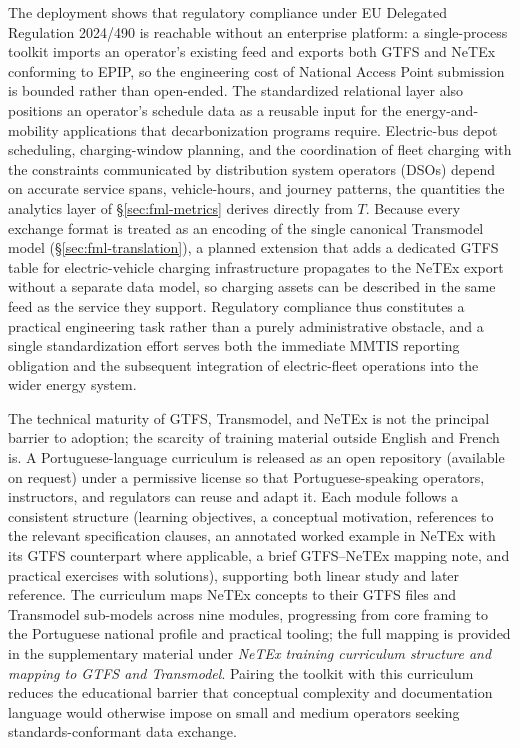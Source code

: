 The deployment shows that regulatory compliance under EU Delegated Regulation
2024/490 is reachable without an enterprise platform: a single-process toolkit
imports an operator's existing feed and exports both GTFS and NeTEx conforming to
EPIP, so the engineering cost of National Access Point submission is bounded rather
than open-ended. The standardized relational layer also positions an operator's
schedule data as a reusable input for the energy-and-mobility applications that
decarbonization programs require. Electric-bus depot scheduling, charging-window
planning, and the coordination of fleet charging with the constraints communicated
by distribution system operators (DSOs) depend on accurate service spans,
vehicle-hours, and journey patterns, the quantities the analytics layer of
\S\ref{sec:fml-metrics} derives directly from $T$. Because every exchange format
is treated as an encoding of the single canonical Transmodel model
(\S\ref{sec:fml-translation}), a planned extension that adds a dedicated GTFS
table for electric-vehicle charging infrastructure
propagates to the NeTEx export without a separate data model, so charging assets
can be described in the same feed as the service they support. Regulatory
compliance thus constitutes a practical engineering task rather than a purely
administrative obstacle, and a single standardization effort serves both the
immediate MMTIS reporting obligation and the subsequent integration of
electric-fleet operations into the wider energy system.
 
The technical maturity of GTFS, Transmodel, and NeTEx is not the principal barrier
to adoption; the scarcity of training material outside English and French is. A
Portuguese-language curriculum is released as an open
repository (available on request)
under a permissive license so that Portuguese-speaking operators, instructors, and
regulators can reuse and adapt it. Each module follows a consistent structure
(learning objectives, a conceptual motivation, references to the relevant
specification clauses, an annotated worked example in NeTEx with its GTFS
counterpart where applicable, a brief GTFS--NeTEx mapping note, and practical
exercises with solutions), supporting both linear study and later reference. The
curriculum maps NeTEx concepts to their GTFS files and Transmodel sub-models across
nine modules, progressing from core framing to the Portuguese national profile and
practical tooling; the full mapping is provided in the supplementary material under
\emph{NeTEx training curriculum structure and mapping to GTFS and Transmodel}.
Pairing the toolkit with this curriculum reduces the
educational barrier that conceptual complexity and documentation language would
otherwise impose on small and medium operators seeking standards-conformant data
exchange.

